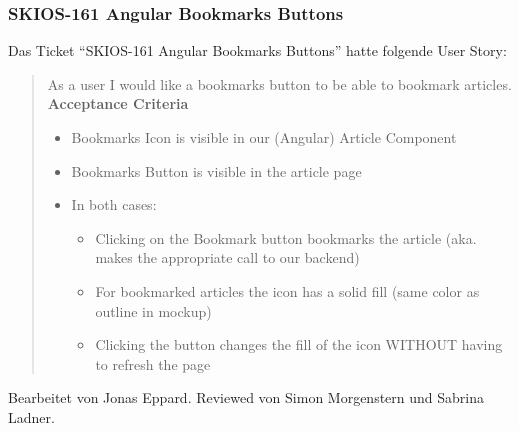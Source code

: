 \subsubsection{SKIOS-161 Angular Bookmarks Buttons}
Das Ticket \enquote{SKIOS-161 Angular Bookmarks Buttons} hatte folgende User Story:
\begin{quotation}
    As a user I would like a bookmarks button to be able to bookmark articles.
\textbf{Acceptance Criteria}
\begin{itemize}
    \item Bookmarks Icon is visible in our (Angular) Article Component
    \item Bookmarks Button is visible in the article page
    \item In both cases:
    \begin{itemize}
        \item Clicking on the Bookmark button bookmarks the article (aka. makes the appropriate call to our backend)
        \item For bookmarked articles the icon has a solid fill (same color as outline in mockup)
        \item Clicking the button changes the fill of the icon WITHOUT having to refresh the page
    \end{itemize}
\end{itemize}
\end{quotation}
Bearbeitet von Jonas Eppard.
Reviewed von Simon Morgenstern und Sabrina Ladner.

